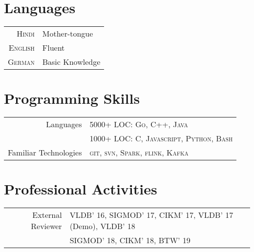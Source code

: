 \documentclass[a4paper,10pt]{article} %
\begin{document}
\section{Languages}

\begin{tabular}{rl}
\textsc{Hindi} & Mother-tongue\\
\textsc{English} & Fluent\\
\textsc{German} & Basic Knowledge\\
\end{tabular}


\section{Programming Skills}

\begin{tabular}{rl}
Languages & 5000+ LOC: \textsc{Go}, \textsc{C++}, \textsc{Java}\\
		  & 1000+ LOC: \textsc{C}, \textsc{Javascript}, \textsc{Python}, \textsc{Bash}\\
		  
Familiar Technologies & \textsc{git},  \textsc{svn},  \textsc{Spark},  \textsc{flink},  \textsc{Kafka} 
\end{tabular}

\section{Professional Activities}
\begin{tabular}{rl}
External Reviewer & VLDB' 16, SIGMOD' 17, CIKM' 17, VLDB' 17 (Demo), VLDB' 18\\
& SIGMOD' 18, CIKM' 18, BTW' 19
\end{tabular}

\end{document}
